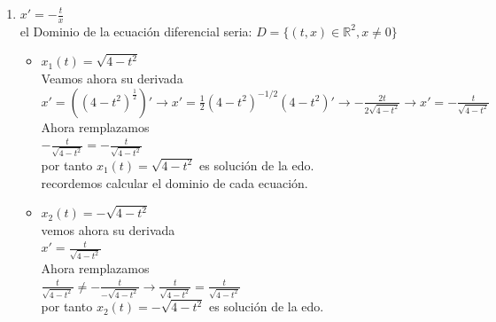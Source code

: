 \documentclass{book}
\begin{document}
\begin{enumerate}
        \item $x'=-\frac{t}{x}$\\ el Dominio de la ecuación diferencial seria: $ D=\{(t,x)\in \mathbb{R}^{2}, x \not = 0\} $
            \begin{itemize}
                \item $x_{1}(t)=\sqrt{4-t^{2}}$\\ Veamos ahora su derivada\\
                $x'=((4-t^{2})^{\frac{1}{2}})' \rightarrow x'= \frac{1}{2}(4-t^{2})^{-1/2}(4-t^{2})' \rightarrow -\frac{2t}{2\sqrt{4-t^{2}}}
                \rightarrow x'= -\frac{t}{\sqrt{4-t^{2}}} $ \\
                Ahora remplazamos\\
                $-\frac{t}{\sqrt{4-t^{2}}} = -\frac{t}{\sqrt{4-t^{2}}} $\\
                por tanto $x_{1}(t)=\sqrt{4-t^{2}}$ es solución de la edo.\\ 
                recordemos calcular el dominio de cada ecuación.
                \item $x_{2}(t)=-\sqrt{4-t^{2}}$ \\ vemos ahora su derivada \\
                $x'=\frac{t}{\sqrt{4-t^{2}}}$\\Ahora remplazamos\\
                $\frac{t}{\sqrt{4-t^{2}}} \not = -\frac{t}{-\sqrt{4-t^{2}}} \rightarrow \frac{t}{\sqrt{4-t^{2}}} = \frac{t}{\sqrt{4-t^{2}}}$
                \\ por tanto $x_{2}(t)=-\sqrt{4-t^{2}}$ es solución de la edo.
            \end{itemize}
    \end{enumerate}
\end{document}
